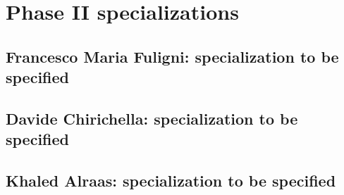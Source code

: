 \section{Phase II specializations}
\subsection{Francesco Maria Fuligni: specialization to be specified}
\subsection{Davide Chirichella: specialization to be specified}
\subsection{Khaled Alraas: specialization to be specified}
